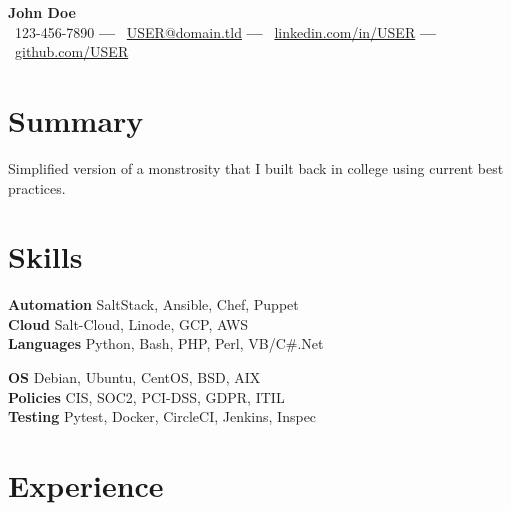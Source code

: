 \documentclass[10pt,a4paper]{article}
\begin{document}
    \begin{center}
    {\huge\bfseries\color{headercolor} John Doe} \\[0.3em]
    \faPhone\ 123-456-7890 \textbf{---} \faEnvelope\ \href{mailto:USER@domain.tld}{USER@domain.tld} \textbf{---} \faLinkedin\ \href{https://linkedin.com/in/USER}{linkedin.com/in/USER} \textbf{---} \faGithub\ \href{https://github.com/USER}{github.com/USER}
    \end{center}

    \vspace{0.2em}

    \section{Summary}
    Simplified version of a monstrosity that I built back in college using current best practices.

    \section{Skills}

    \begin{multicols}{2}
        \textbf{Automation} SaltStack, Ansible, Chef, Puppet \\
        \textbf{Cloud} Salt-Cloud, Linode, GCP, AWS \\
        \textbf{Languages} Python, Bash, PHP, Perl, VB/C\#.Net \\

        \columnbreak

        \textbf{OS} Debian, Ubuntu, CentOS, BSD, AIX \\
        \textbf{Policies} CIS, SOC2, PCI-DSS, GDPR, ITIL \\
        \textbf{Testing} Pytest, Docker, CircleCI, Jenkins, Inspec \\
    \end{multicols}

    \section{Experience}
\end{document}
